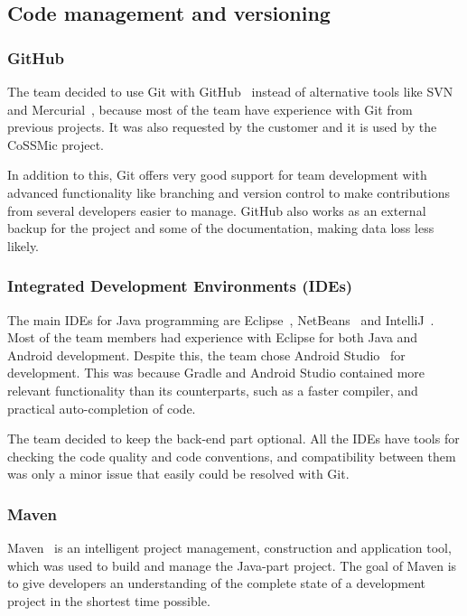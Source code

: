 \subsection{Code management and versioning}
\subsubsection{GitHub}
The team decided to use Git with GitHub~\cite{github} instead of alternative tools like SVN~\cite{svn} and Mercurial~\cite{mercurial}, because most of the team have experience with Git from previous projects. It was also requested by the customer and it is used by the CoSSMic project. 

In addition to this, Git offers very good support for team development with advanced functionality like branching and version control to make contributions from several developers easier to manage. GitHub also works as an external backup for the project and some of the documentation, making data loss less likely.

\subsubsection{Integrated Development Environments (IDEs)}
The main IDEs for Java programming are Eclipse~\cite{eclipse}, NetBeans~\cite{netbeans} and IntelliJ~\cite{intellij}. Most of the team members had experience with Eclipse for both Java and Android development. Despite this, the team chose Android Studio~\cite{android-studio} for development. This was because Gradle and Android Studio contained more relevant functionality than its counterparts, such as a faster compiler, and practical auto-completion of code.%

The team decided to keep the back-end part optional. All the IDEs have tools for checking the code quality and code conventions, and compatibility between them was only a minor issue that easily could be resolved with Git.

\subsubsection{Maven}
Maven~\cite{maven} is an intelligent project management, construction and application tool, which was used to build and manage the Java-part project. The goal of Maven is to give developers an understanding of the complete state of a development project in the shortest time possible.

